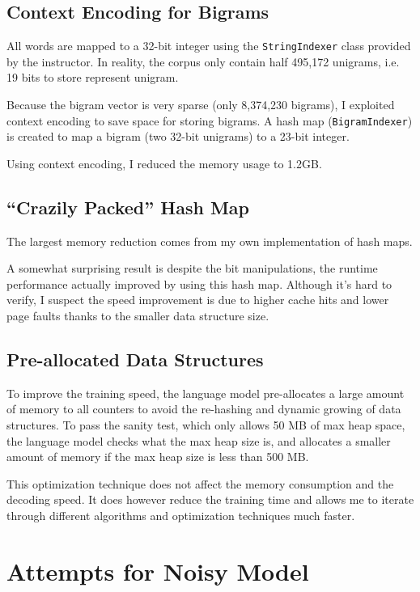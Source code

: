 \documentclass[12pt]{article}   %
\begin{document}
\subsection{Context Encoding for Bigrams}
All words are mapped to a 32-bit integer using the \texttt{StringIndexer} class provided by the instructor. In reality, the corpus only contain half 495,172 unigrams, i.e. 19 bits to store represent unigram.

Because the bigram vector is very sparse (only 8,374,230 bigrams), I exploited context encoding to save space for storing bigrams. A hash map (\texttt{BigramIndexer}) is created to map a bigram (two 32-bit unigrams) to a 23-bit integer.

Using context encoding, I reduced the memory usage to 1.2GB.


\subsection{“Crazily Packed” Hash Map}
The largest memory reduction comes from my own implementation of hash maps.

A somewhat surprising result is despite the bit manipulations, the runtime performance actually improved by using this hash map. Although it’s hard to verify, I suspect the speed improvement is due to higher cache hits and lower page faults thanks to the smaller data structure size.


\subsection{Pre-allocated Data Structures}
To improve the training speed, the language model pre-allocates a large amount of memory to all counters to avoid the re-hashing and dynamic growing of data structures. To pass the sanity test, which only allows 50 MB of max heap space, the language model checks what the max heap size is, and allocates a smaller amount of memory if the max heap size is less than 500 MB.

This optimization technique does not affect the memory consumption and the decoding speed. It does however reduce the training time and allows me to iterate through different algorithms and optimization techniques much faster.

\section{Attempts for Noisy Model}
\end{document}

